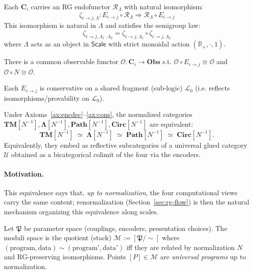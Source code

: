 \begin{axiom}[RG-compatibility]
\label{ax:rg}
Each $\mathbf{C}_i$ carries an RG endofunctor $\mathcal{R}_\Lambda$ with natural isomorphism:
\[
\zeta_{i\to j,\Lambda} : E_{i\to j}\circ \mathcal{R}_\Lambda \Rightarrow \mathcal{R}_\Lambda \circ E_{i\to j}
\]
This isomorphism is natural in $\Lambda$ and satisfies the semigroup law:
\[
\zeta_{i\to j,\Lambda_1 \cdot \Lambda_2} = \zeta_{i\to j,\Lambda_1} \circ \zeta_{i\to j,\Lambda_2}
\]
where $\Lambda$ acts as an object in $\mathsf{Scale}$ with strict monoidal action $(\mathbb{R}_+, \cdot, 1)$.
\end{axiom}

\begin{axiom}
\label{ax:obs}
There is a common observable functor $\mathcal{O}:\mathbf{C}_i\to\mathbf{Obs}$ s.t.
$\mathcal{O}\circ E_{i\to j}\cong \mathcal{O}$ and $\mathcal{O}\circ N\cong \mathcal{O}$.
\end{axiom}

\begin{axiom}
\label{ax:cons}
Each $E_{i\to j}$ is conservative on a shared fragment (sub-logic) $\mathcal{L}_0$
(i.e. reflects isomorphisms/provability on $\mathcal{L}_0$).
\end{axiom}

\begin{conjecture}
\label{conj:alignment}
Under Axioms~\ref{ax:encdec}–\ref{ax:cons}, the normalized categories
$\mathbf{TM}[N^{-1}],\mathbf{\Lambda}[N^{-1}],\mathbf{Path}[N^{-1}],\mathbf{Circ}[N^{-1}]$
are equivalent:
\[
\mathbf{TM}[N^{-1}] \;\simeq\; \mathbf{\Lambda}[N^{-1}] \;\simeq\; \mathbf{Path}[N^{-1}] \;\simeq\; \mathbf{Circ}[N^{-1}].
\]
Equivalently, they embed as reflective subcategories of a universal glued category
$\mathcal{U}$ obtained as a bicategorical colimit of the four via the encoders.
\end{conjecture}

\paragraph{Motivation.}
This equivalence says that, \emph{up to normalization}, the four computational views
carry the same content; renormalization (Section~\ref{sec:rg-flow}) is then the natural
mechanism organizing this equivalence along scales.

\begin{definition}
\label{def:moduli}
Let $\mathfrak{P}$ be parameter space (couplings, encoders, presentation choices).
The moduli space is the quotient (stack) $\mathcal{M} := [\mathfrak{P} / \sim]$ where
$(\text{program},\text{data})\sim(\text{program}',\text{data}')$ iff they are related
by normalization $N$ and RG-preserving isomorphisms. Points $[P]\in\mathcal{M}$ are
\emph{universal programs} up to normalization.
\end{definition}

